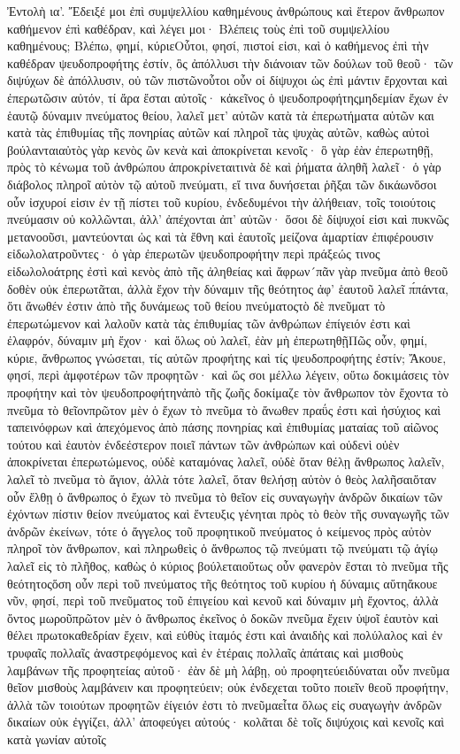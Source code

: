 Ἐντολὴ ια’.
Ἔδειξέ μοι ἐπὶ συμψελλίου καθημένους ἀνθρώπους καὶ ἕτερον ἄνθρωπον καθήμενον ἐπὶ καθέδραν, καὶ λέγει μοι· Βλέπεις τοὺς ἐπὶ τοῦ συμψελλίου καθημένους; Βλέπω, φημί, κύριεΟὗτοι, φησί, πιστοί εἰσι, καὶ ὁ καθήμενος ἐπὶ τὴν καθέδραν ψευδοπροφήτης ἐστίν, ὃς ἀπόλλυσι τὴν διάνοιαν τῶν δούλων τοῦ θεοῦ· τῶν διψύχων δὲ ἀπόλλυσιν, οὐ τῶν πιστῶνοὗτοι οὖν οἱ δίψυχοι ὡς ἐπὶ μάντιν ἔρχονται καὶ ἐπερωτῶσιν αὐτόν, τί ἄρα ἔσται αὐτοῖς· κἀκεῖνος ὁ ψευδοπροφήτηςμηδεμίαν ἔχων ἐν ἑαυτῷ δύναμιν πνεύματος θείου, λαλεῖ μετ’ αὐτῶν κατὰ τὰ ἐπερωτήματα αὐτῶν και κατὰ τὰς ἐπιθυμίας τῆς πονηρίας αὐτῶν καί πληροῖ τὰς ψυχὰς αὐτῶν, καθὼς αὐτοὶ βούλανταιαὐτὸς γὰρ κενὸς ὢν κενὰ καὶ ἀποκρίνεται κενοῖς· ὃ γὰρ ἐὰν ἐπερωτηθῇ, πρὸς τὸ κένωμα τοῦ ἀνθρώπου ἀπροκρίνεταιτινὰ δὲ καὶ ῥήματα ἀληθῆ λαλεῖ· ὁ γὰρ διάβολος πληροῖ αὐτὸν τῷ αὐτοῦ πνεύματι, εἴ τινα δυνήσεται ῥῆξαι τῶν δικάωνὅσοι οὖν ἰσχυροί εἰσιν ἐν τῇ πίστει τοῦ κυρίου, ἐνδεδυμένοι τὴν ἀλήθειαν, τοῖς τοιούτοις πνεύμασιν οὐ κολλῶνται, ἀλλ’ ἀπέχονται ἀπ’ αὐτῶν· ὅσοι δὲ δίψυχοί εἰσι καὶ πυκνῶς μετανοοῦσι, μαντεύονται ὡς καὶ τὰ ἔθνη καὶ ἑαυτοῖς μείζονα ἁμαρτίαν ἐπιφέρουσιν εἰδωλολατροῦντες· ὁ γὰρ ἐπερωτῶν ψευδοπροφήτην περὶ πράξεώς τινος εἰδωλολοάτρης ἐστὶ καὶ κενὸς ἀπὸ τῆς ἀληθείας καὶ ἄφρων´πᾶν γὰρ πνεῦμα ἀπὸ θεοῦ δοθὲν οὐκ ἐπερωτᾶται, ἀλλὰ ἔχον τὴν δύναμιν τῆς θεότητος ἀφ’ ἑαυτοῦ λαλεῖ π́πάντα, ὅτι ἄνωθέν ἐστιν ἀπὸ τῆς δυνάμεως τοῦ θείου πνεύματοςτὸ δὲ πνεῦματ τὸ ἐπερωτώμενον καὶ λαλοῦν κατὰ τὰς ἐπιθυμίας τῶν ἀνθρώπων ἐπίγειόν ἐστι καὶ ἐλαφρόν, δύναμιν μὴ ἔχον· καὶ ὅλως οὐ λαλεῖ, ἐὰν μὴ ἐπερωτηθῇΠῶς οὖν, φημί, κύριε, ἄνθρωπος γνώσεται, τίς αὐτῶν προφήτης καὶ τίς ψευδοπροφήτης ἐστίν; Ἄκουε, φησί, περὶ ἀμφοτέρων τῶν προφητῶν· καὶ ὥς σοι μέλλω λέγειν, οὕτω δοκιμάσεις τὸν προφήτην καὶ τὸν ψευδοπροφήτηνἀπὸ τῆς ζωῆς δοκίμαζε τὸν ἄνθρωπον τὸν ἔχοντα τὸ πνεῦμα τὸ θεῖονπρῶτον μὲν ὁ ἔχων τὸ πνεῦμα τὸ ἄνωθεν πραΰς ἐστι καὶ ἡσύχιος καὶ ταπεινόφρων καὶ ἀπεχόμενος ἀπὸ πάσης πονηρίας καὶ ἐπιθυμίας ματαίας τοῦ αἰῶνος τούτου καὶ ἑαυτὸν ἐνδεέστερον ποιεῖ πάντων τῶν ἀνθρώπων καὶ οὐδενὶ οὐὲν ἀποκρίνεται ἐπερωτώμενος, οὐδὲ καταμόνας λαλεῖ, οὐδὲ ὅταν θέλῃ ἄνθρωπος λαλεῖν, λαλεῖ τὸ πνεῦμα τὸ ἅγιον, ἀλλὰ τότε λαλεῖ, ὅταν θελήσῃ αὐτὸν ὁ θεὸς λαλῆσαιὅταν οὖν ἔλθῃ ὁ ἄνθρωπος ὁ ἔχων τὸ πνεῦμα τὸ θεῖον εἰς συναγωγὴν ἀνδρῶν δικαίων τῶν ἐχόντων πίστιν θείον πνεύματος καὶ ἔντευξις γένηται πρὸς τὸ θεὸν τῆς συναγωγῆς τῶν ἀνδρῶν ἐκείνων, τότε ὁ ἄγγελος τοῦ προφητικοῦ πνεύματος ὁ κείμενος πρὸς αὐτὸν πληροῖ τὸν ἄνθρωπον, καὶ πληρωθεὶς ὁ ἄνθρωπος τῷ πνεύματι τῷ πνεύματι τῷ ἁγίῳ λαλεῖ εἰς τὸ πλῆθος, καθὼς ὁ κύριος βούλεταιοὕτως οὖν φανερὸν ἔσται τὸ πνεῦμα τῆς θεότητοςὅση οὖν περὶ τοῦ πνεύματος τῆς θεότητος τοῦ κυρίου ἡ δύναμις αὕτηἄκουε νῦν, φησί, περὶ τοῦ πνεῦματος τοῦ ἐπιγείου καὶ κενοῦ καὶ δύναμιν μὴ ἔχοντος, ἀλλὰ ὄντος μωροῦπρῶτον μὲν ὁ ἄνθρωπος ἐκεῖνος ὁ δοκῶν πνεῦμα ἔχειν ὑψοῖ ἑαυτὸν καὶ θέλει πρωτοκαθεδρίαν ἔχειν, καὶ εὐθὺς ἰταμός ἐστι καὶ ἀναιδὴς καὶ πολύλαλος καὶ ἐν τρυφαῖς πολλαῖς ἀναστρεφόμενος καὶ ἐν ἑτέραις πολλαῖς ἀπάταις καὶ μισθοὺς λαμβάνων τῆς προφητείας αὐτοῦ· ἐὰν δὲ μὴ λάβῃ, οὐ προφητεύειδύναται οὖν πνεῦμα θεῖον μισθοὺς λαμβάνειν και προφητεύειν; οὐκ ἐνδεχεται τοῦτο ποιεῖν θεοῦ προφήτην, ἀλλὰ τῶν τοιούτων προφητῶν ἐίγειόν ἐστι τὸ πνεῦμαεἶτα ὅλως εἰς συαγωγὴν ἀνδρῶν δικαίων οὐκ ἐγγίζει, ἀλλ’ ἀποφεύγει αὐτούς· κολᾶται δὲ τοῖς διψύχοις καὶ κενοῖς καὶ κατὰ γωνίαν αὐτοῖς 